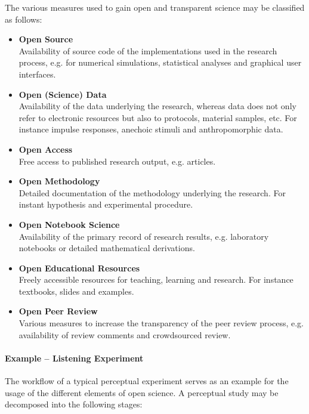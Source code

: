 \documentclass[a4paper, 10pt, twocolumn]{article}
\begin{document}
The various measures used to gain open and transparent science may be classified as
follows:
\begin{itemize}
\item \textbf{Open Source}\\
Availability of source code of the implementations used in the research process, e.g. 
for numerical simulations, statistical analyses and graphical user interfaces.
%
\item \textbf{Open (Science) Data}\\
Availability of the data underlying the research, whereas data does not only refer 
to electronic resources but also to protocols, material samples, etc. For instance
impulse responses, anechoic stimuli and anthropomorphic data.
%
\item \textbf{Open Access}\\
Free access to published research output, e.g. articles.
%
\item \textbf{Open Methodology}\\
Detailed documentation of the methodology underlying the research. For instant hypothesis 
and experimental procedure.
%
\item \textbf{Open Notebook Science}\\
Availability of the primary record of research results, e.g. laboratory notebooks or 
detailed mathematical derivations.
%
\item \textbf{Open Educational Resources}\\
Freely accessible resources for teaching, learning and research. For instance textbooks, slides and
examples.
%
\item \textbf{Open Peer Review}~\cite{Ford13:LFP}\\
Various measures to increase the transparency of the peer review process, e.g. availability of 
review comments and crowdsourced review.
\end{itemize}


\paragraph*{Example -- Listening Experiment}

The workflow of a typical perceptual experiment serves as an example for the usage of 
the different elements of open science. A perceptual study may be decomposed into the
following stages:
\end{document}
